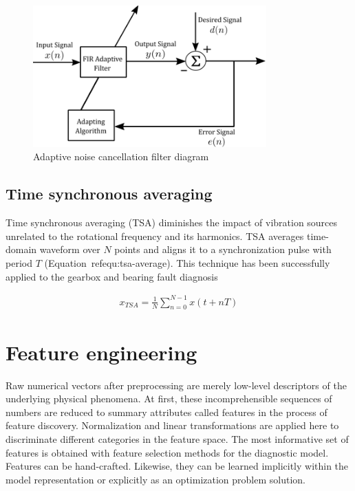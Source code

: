 \begin{figure}[h]
	\centering
	\includegraphics[width=0.8\textwidth]{assets/adaptive-filter.png}
	\caption{Adaptive noise cancellation filter diagram}
	\label{fig:adaptive-filter}
\end{figure}
\bigbreak

\subsection{Time synchronous averaging}
Time synchronous averaging (TSA) diminishes the impact of vibration sources unrelated to the rotational frequency and its harmonics. TSA averages time-domain waveform over $N$ points and aligns it to a synchronization pulse with period $T$ (Equation~ref{equ:tsa-average}). This technique has been successfully applied to the gearbox and bearing fault diagnosis~\cite{davies_handbook_2012,nandi_condition_2019}
\begin{ceqn}\begin{align}
x_{TSA} = \frac{1}{N} \sum_{n = 0}^{N - 1}{x(t + nT)}
\label{equ:tsa-average}
\end{align}\end{ceqn}


\section{Feature engineering}
Raw numerical vectors after preprocessing are merely low-level descriptors of the underlying physical phenomena. At first, these incomprehensible sequences of numbers are reduced to summary attributes called features in the process of feature discovery. Normalization and linear transformations are applied here to discriminate different categories in the feature space. The most informative set of features is obtained with feature selection methods for the diagnostic model. Features can be hand-crafted. Likewise, they can be learned implicitly within the model representation or explicitly as an optimization problem solution.  

